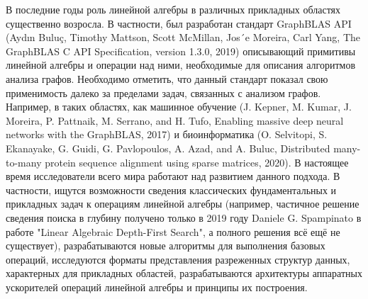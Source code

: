 \documentclass[12pt]{article}  %
\theoremstyle{remark}
\begin{document}
В последние годы роль линейной алгебры в различных прикладных областях существенно возросла. В частности, был разработан стандарт GraphBLAS API (Aydın Buluç, Timothy Mattson, Scott McMillan, Jos´e Moreira, Carl Yang, The GraphBLAS C API Specification, version 1.3.0, 2019) описывающий примитивы линейной алгебры и операции над ними, необходимые для описания алгоритмов анализа графов. Необходимо отметить, что данный стандарт показал свою применимость далеко за пределами задач, связанных с анализом графов. Например, в таких областях, как машинное обучение (J. Kepner, M. Kumar, J. Moreira, P. Pattnaik, M. Serrano, and H. Tufo, Enabling massive deep neural networks with the GraphBLAS, 2017) и биоинформатика (O. Selvitopi, S. Ekanayake, G. Guidi, G. Pavlopoulos, A. Azad, and A. Buluc, Distributed many-to-many protein sequence alignment using sparse matrices, 2020). В настоящее время исследователи всего мира работают над развитием данного подхода. В частности, ищутся возможности сведения классических фундаментальных и прикладных задач к операциям линейной алгебры (например, частичное решение сведения поиска в глубину получено только в 2019 году Daniele G. Spampinato в работе "Linear Algebraic Depth-First Search", а полного решения всё ещё не существует), разрабатываются новые алгоритмы для выполнения базовых операций, исследуются форматы представления разреженных структур данных, характерных для прикладных областей, разрабатываются архитектуры аппаратных ускорителей операций линейной алгебры и принципы их построения.
\end{document}
